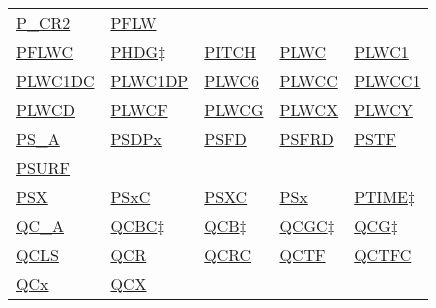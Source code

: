 \documentclass[
  english,
]{book}
\begin{document}
\begin{longtable}[]{@{}lllll@{}}
\href{./the-state-of-the-atmosphere.html\#p-special}{P\_CR2} &
\href{./aerosol-particle-measurements.html\#pflw}{PFLW} \\
\href{./aerosol-particle-measurements.html\#pflw}{PFLWC} &
\href{./obsolete-variables.html\#ltn51}{PHDG\(\ddagger\)} &
\href{./the-state-of-the-aircraft.html\#pitch}{PITCH} &
\href{./cloud-physics-variables.html\#plwc}{PLWC} &
\href{./cloud-physics-variables.html\#plwc}{PLWC1} \\
\href{./cloud-physics-variables.html\#lwc2d}{PLWC1DC} &
\href{./cloud-physics-variables.html\#lwc2d}{PLWC1DP} &
\href{./cloud-physics-variables.html\#PSD-LWC}{PLWC6} &
\href{./cloud-physics-variables.html\#plwcc}{PLWCC} &
\href{./cloud-physics-variables.html\#plwcc}{PLWCC1} \\
\href{./cloud-physics-variables.html\#PSD-LWC}{PLWCD} &
\href{./cloud-physics-variables.html\#PSD-LWC}{PLWCF} &
\href{./cloud-physics-variables.html\#plwcg}{PLWCG} &
\href{./cloud-physics-variables.html\#PSD-LWC}{PLWCX} &
\href{./cloud-physics-variables.html\#PSD-LWC}{PLWCY} \\
\href{./the-state-of-the-atmosphere.html\#psx}{PS\_A} &
\href{./the-state-of-the-atmosphere.html\#p-special}{PSDPx} &
\href{./the-state-of-the-atmosphere.html\#psx}{PSFD} &
\href{./the-state-of-the-atmosphere.html\#psx}{PSFRD} &
\href{./the-state-of-the-atmosphere.html\#psx}{PSTF} \\
\href{./the-state-of-the-atmosphere.html\#p-special}{PSURF} & & & & \\
\href{./the-state-of-the-atmosphere.html\#psx}{PSX} &
\href{./the-state-of-the-atmosphere.html\#psx}{PSxC} &
\href{./the-state-of-the-atmosphere.html\#psx}{PSXC} &
\href{./the-state-of-the-atmosphere.html\#psx}{PSx} &
\href{./obsolete-variables.html\#ptime}{PTIME\(\ddagger\)} \\
\href{./the-state-of-the-atmosphere.html\#qcx}{QC\_A} &
\href{./obsolete-variables.html\#qcb}{QCBC\(\ddagger\)} &
\href{./obsolete-variables.html\#qcb}{QCB\(\ddagger\)} &
\href{./obsolete-variables.html\#qcb}{QCGC\(\ddagger\)} &
\href{./obsolete-variables.html\#qcb}{QCG\(\ddagger\)} \\
\href{./air-chemistry-measurements.html\#awas-cims-qcls-toga}{QCLS} &
\href{./the-state-of-the-atmosphere.html\#qcx}{QCR} &
\href{./the-state-of-the-atmosphere.html\#qcx}{QCRC} &
\href{./the-state-of-the-atmosphere.html\#qcx}{QCTF} &
\href{./the-state-of-the-atmosphere.html\#qcx}{QCTFC} \\
\href{./the-state-of-the-atmosphere.html\#qcx}{QCx} &
\href{./the-state-of-the-atmosphere.html\#qcx}{QCX} &

\end{longtable}
\end{document}
